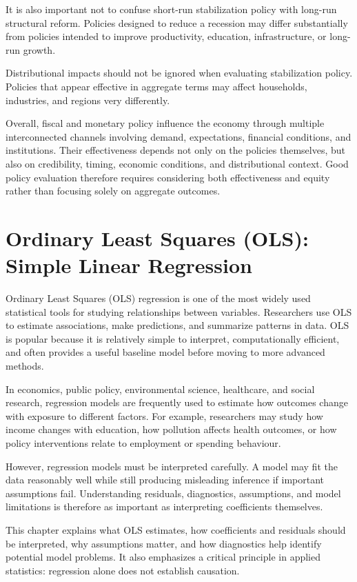 \documentclass[
  11pt,
  oneside]{book}
\begin{document}
It is also important not to confuse short-run stabilization policy with long-run structural reform. Policies designed to reduce a recession may differ substantially from policies intended to improve productivity, education, infrastructure, or long-run growth.

Distributional impacts should not be ignored when evaluating stabilization policy. Policies that appear effective in aggregate terms may affect households, industries, and regions very differently.

Overall, fiscal and monetary policy influence the economy through multiple interconnected channels involving demand, expectations, financial conditions, and institutions. Their effectiveness depends not only on the policies themselves, but also on credibility, timing, economic conditions, and distributional context. Good policy evaluation therefore requires considering both effectiveness and equity rather than focusing solely on aggregate outcomes.

\chapter{Ordinary Least Squares (OLS): Simple Linear Regression}\label{ols}

Ordinary Least Squares (OLS) regression is one of the most widely used statistical tools for studying relationships between variables. Researchers use OLS to estimate associations, make predictions, and summarize patterns in data. OLS is popular because it is relatively simple to interpret, computationally efficient, and often provides a useful baseline model before moving to more advanced methods.

In economics, public policy, environmental science, healthcare, and social research, regression models are frequently used to estimate how outcomes change with exposure to different factors. For example, researchers may study how income changes with education, how pollution affects health outcomes, or how policy interventions relate to employment or spending behaviour.

However, regression models must be interpreted carefully. A model may fit the data reasonably well while still producing misleading inference if important assumptions fail. Understanding residuals, diagnostics, assumptions, and model limitations is therefore as important as interpreting coefficients themselves.

This chapter explains what OLS estimates, how coefficients and residuals should be interpreted, why assumptions matter, and how diagnostics help identify potential model problems. It also emphasizes a critical principle in applied statistics: regression alone does not establish causation.
\end{document}
